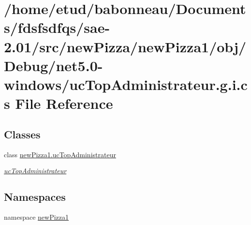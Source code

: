 \hypertarget{net5_80-windows_2ucTopAdministrateur_8g_8i_8cs}{}\section{/home/etud/babonneau/\+Documents/fdsfsdfqs/sae-\/2.01/src/new\+Pizza/new\+Pizza1/obj/\+Debug/net5.0-\/windows/uc\+Top\+Administrateur.g.\+i.\+cs File Reference}
\label{net5_80-windows_2ucTopAdministrateur_8g_8i_8cs}
\subsection*{Classes}
\begin{DoxyCompactItemize}
\item 
class \hyperlink{classnewPizza1_1_1ucTopAdministrateur}{new\+Pizza1.\+uc\+Top\+Administrateur}
\begin{DoxyCompactList}\small\item\em \hyperlink{classnewPizza1_1_1ucTopAdministrateur}{uc\+Top\+Administrateur} \end{DoxyCompactList}\end{DoxyCompactItemize}
\subsection*{Namespaces}
\begin{DoxyCompactItemize}
\item 
namespace \hyperlink{namespacenewPizza1}{new\+Pizza1}
\end{DoxyCompactItemize}
